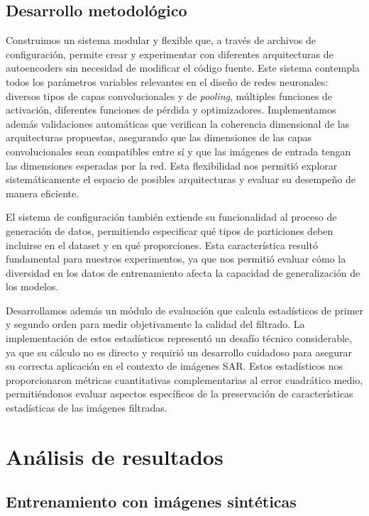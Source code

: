 \subsection{Desarrollo metodológico}

Construimos un sistema modular y flexible que, a través de archivos de configuración, permite crear y experimentar con diferentes arquitecturas de autoencoders sin necesidad de modificar el código fuente. Este sistema contempla todos los parámetros variables relevantes en el diseño de redes neuronales: diversos tipos de capas convolucionales y de \emph{pooling}, múltiples funciones de activación, diferentes funciones de pérdida y optimizadores. Implementamos además validaciones automáticas que verifican la coherencia dimensional de las arquitecturas propuestas, asegurando que las dimensiones de las capas convolucionales sean compatibles entre sí y que las imágenes de entrada tengan las dimensiones esperadas por la red. Esta flexibilidad nos permitió explorar sistemáticamente el espacio de posibles arquitecturas y evaluar su desempeño de manera eficiente.

El sistema de configuración también extiende su funcionalidad al proceso de generación de datos, permitiendo especificar qué tipos de particiones deben incluirse en el dataset y en qué proporciones. Esta característica resultó fundamental para nuestros experimentos, ya que nos permitió evaluar cómo la diversidad en los datos de entrenamiento afecta la capacidad de generalización de los modelos.

Desarrollamos además un módulo de evaluación que calcula estadísticos de primer y segundo orden para medir objetivamente la calidad del filtrado. La implementación de estos estadísticos representó un desafío técnico considerable, ya que su cálculo no es directo y requirió un desarrollo cuidadoso para asegurar su correcta aplicación en el contexto de imágenes SAR. Estos estadísticos nos proporcionaron métricas cuantitativas complementarias al error cuadrático medio, permitiéndonos evaluar aspectos específicos de la preservación de características estadísticas de las imágenes filtradas.

\section{Análisis de resultados}

\subsection{Entrenamiento con imágenes sintéticas}

